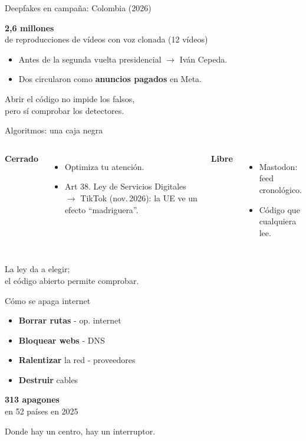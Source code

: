 \documentclass[aspectratio=169,12pt]{beamer}
\def\navprev{}
\def\navnext{}
\newcommand{\nav}[2]{\gdef\navprev{#1}\gdef\navnext{#2}}
\newcommand{\cifra}[2]{%
  \begin{center}
    {\color{terra}\fontsize{36}{40}\selectfont\bfseries #1}\\[0.2cm]
    {\large #2}
  \end{center}}
\begin{document}
\nav{Deepfake en Eslovaquia}{Algoritmos}
\begin{frame}{Deepfakes en campaña: Colombia (2026)}
  \cifra{2,6 millones}{de reproducciones de vídeos con voz clonada (12 vídeos)}
  \begin{itemize}
    \item Antes de la segunda vuelta presidencial $\to$ Iván Cepeda.
    \item Dos circularon como \textbf{anuncios pagados} en Meta.
  \end{itemize}
  \vspace{0.4cm}
  {\alert{Abrir el código no impide los falsos,\\pero sí comprobar los detectores.}}
\end{frame}

\nav{Deepfakes en Colombia}{Apagones de internet}
\begin{frame}{Algoritmos: una caja negra}
  \begin{columns}[T]
      \textbf{Cerrado}
      \begin{itemize}
        \item Optimiza tu atención.
        \item Art 38. Ley de Servicios Digitales $\to$ TikTok (nov.\,2026): la UE ve un efecto ``madriguera''.
      \end{itemize}
      \textbf{Libre}
      \begin{itemize}
        \item Mastodon: feed cronológico.
        \item Código que cualquiera lee.
      \end{itemize}
  \end{columns}
  \vspace{0.6cm}
  {\large\alert{La ley da a elegir;\\el código abierto permite comprobar.}}
\end{frame}

\nav{Algoritmos}{Irán sin internet}
\begin{frame}{Cómo se apaga internet}
  \begin{itemize}
    \item \textbf{Borrar rutas} - op. internet
    \item \textbf{Bloquear webs} - DNS
    \item \textbf{Ralentizar} la red - proveedores
    \item \textbf{Destruir} cables 
  \end{itemize}
  \cifra{313 apagones}{en 52 países en 2025}
  {\large\alert{Donde hay un centro, hay un interruptor.}}
\end{frame}
\end{document}
